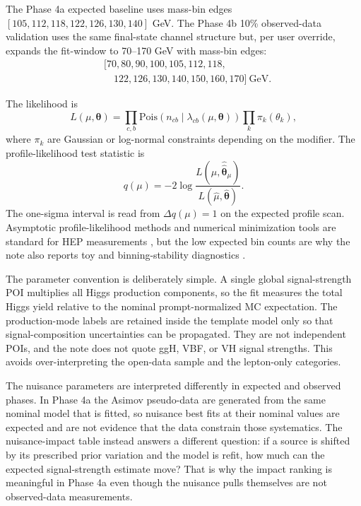 \documentclass[11pt]{article}
\begin{document}
The Phase 4a expected baseline uses mass-bin edges $[105,112,118,122,126,130,140]$ GeV.
The Phase 4b 10\% observed-data validation uses the same final-state channel structure but, per user override, expands the fit-window to 70--170 GeV with mass-bin edges:
\begin{equation}
\begin{split}
&[70,80,90,100,105,112,118,\\
&\quad 122,126,130,140,150,160,170]\ \mathrm{GeV}.
\end{split}
\end{equation}

The likelihood is
\begin{equation}
 L(\mu,\boldsymbol{\theta}) =
 \prod_{c,b}\mathrm{Pois}\!\left(n_{cb}\mid \lambda_{cb}(\mu,\boldsymbol{\theta})\right)
 \prod_k \pi_k(\theta_k),
 \label{eq:likelihood}
\end{equation}
where $\pi_k$ are Gaussian or log-normal constraints depending on the modifier. The profile-likelihood test statistic is
\begin{equation}
 q(\mu) = -2\log\frac{L(\mu,\hat{\hat{\boldsymbol{\theta}}}_{\mu})}{L(\hat{\mu},\hat{\boldsymbol{\theta}})}.
 \label{eq:profile}
\end{equation}
The one-sigma interval is read from $\Delta q(\mu)=1$ on the expected profile scan. Asymptotic profile-likelihood methods and numerical minimization tools are standard for HEP measurements \cite{Cowan2011,Minuit}, but the low expected bin counts are why the note also reports toy and binning-stability diagnostics \cite{Cowan2011}.

The parameter convention is deliberately simple. A single global signal-strength POI multiplies all Higgs production components, so the fit measures the total Higgs yield relative to the nominal prompt-normalized MC expectation. The production-mode labels are retained inside the template model only so that signal-composition uncertainties can be propagated. They are not independent POIs, and the note does not quote ggH, VBF, or VH signal strengths. This avoids over-interpreting the open-data sample and the lepton-only categories.

The nuisance parameters are interpreted differently in expected and observed phases. In Phase 4a the Asimov pseudo-data are generated from the same nominal model that is fitted, so nuisance best fits at their nominal values are expected and are not evidence that the data constrain those systematics. The nuisance-impact table instead answers a different question: if a source is shifted by its prescribed prior variation and the model is refit, how much can the expected signal-strength estimate move? That is why the impact ranking is meaningful in Phase 4a even though the nuisance pulls themselves are not observed-data measurements.
\end{document}
